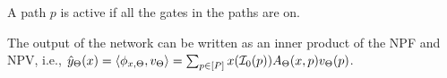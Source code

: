 A path $p$ is active if all the gates in the paths are on.
\begin{comment}
\begin{proposition}
In DNNs without any bias, the NPFs are \emph{positively homogeneous}, i.e., $\phi_{cx,\Theta}=c\phi_{x,\Theta},\forall c>0, x\in\R^{d_{in}}$. 
\end{proposition}
\end{comment}
\begin{proposition}\label{prop:zero}  The output of the network can be written as an inner product of the NPF and NPV, i.e., 
$\hat{y}_{\Theta}(x)=\langle \phi_{x,\Theta},v_{\Theta}\rangle=\sum_{p\in [P]}x(\mathcal{I}_0(p))A_{\Theta}(x,p)v_{\Theta}(p)$.
\end{proposition}
